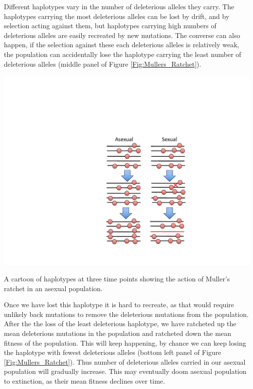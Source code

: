 Different haplotypes vary in the number of deleterious alleles they carry. The haplotypes carrying the most deleterious alleles can be lost by drift, and by selection acting against them, but haplotypes carrying high numbers of deleterious alleles are easily recreated by new mutations. The converse can also happen, if the selection against these each deleterious alleles is relatively weak, the population can accidentally lose the haplotype carrying the least number of deleterious alleles (middle panel of Figure \ref{Fig:Mullers_Ratchet}). \begin{marginfigure}[0cm]
\begin{center}
  \includegraphics[width = \textwidth]{figures/Mullers_Ratchet.pdf}
\end{center}
\caption{A cartoon of haplotypes at three time points showing the action of Muller's ratchet in an asexual population.} \label{Fig:Mullers_Ratchet}  
\end{marginfigure} Once we have lost this haplotype it is hard to recreate, as that would require unlikely back mutations to remove the deleterious mutations from the population. After the the loss of the least deleterious haplotype, we have ratcheted up the mean deleterious mutations in the population and ratcheted down the mean fitness of the population. This will keep happening, by chance we can keep losing the haplotype with fewest deleterious alleles (bottom left panel of Figure \ref{Fig:Mullers_Ratchet}). Thus number of deleterious alleles carried in our asexual population will gradually increase. This may eventually doom asexual population to extinction, as their mean fitness declines over time.

